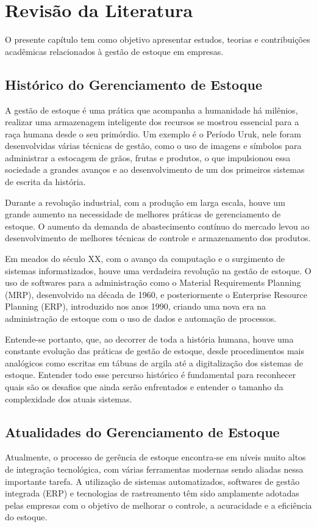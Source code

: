 \documentclass[
	12pt,				%
	openany,			%
	twoside,			%
	a4paper,			%
	english,			%
	brazil				%
	]{abntex2}
\begin{document}


\chapter{Revisão da Literatura}
O presente capítulo tem como objetivo apresentar estudos, teorias e contribuições acadêmicas relacionados à gestão de estoque em empresas.
\section{Histórico do Gerenciamento de Estoque}
A gestão de estoque é uma prática que acompanha a humanidade há milênios, realizar uma armazenagem inteligente dos recursos se mostrou essencial para a raça humana desde o seu primórdio. Um exemplo é o Período Uruk, nele foram desenvolvidas várias técnicas de gestão, como o uso de imagens e símbolos para administrar a estocagem de grãos, frutas e produtos, o que impulsionou essa sociedade a grandes avanços e ao desenvolvimento de um dos primeiros sistemas de escrita da história. \cite{Albright1996}

Durante a revolução industrial, com a produção em larga escala, houve um grande aumento na necessidade de melhores práticas de gerenciamento de estoque. O aumento da demanda de abastecimento contínuo do mercado levou ao desenvolvimento de melhores técnicas de controle e armazenamento dos produtos. \cite{DIAS2021}

Em meados do século XX, com o avanço da computação e o surgimento de sistemas informatizados, houve uma verdadeira revolução na gestão de estoque. O uso de softwares para a administração como o Material Requirements Planning (MRP), desenvolvido na década de 1960, e posteriormente o Enterprise Resource Planning (ERP), introduzido nos anos 1990, criando uma nova era na administração de estoque com o uso de dados e automação de processos.

Entende-se portanto, que, ao decorrer de toda a história humana, houve uma constante evolução das práticas de gestão de estoque, desde procedimentos mais analógicos como escritas em tábuas de argila até a digitalização dos sistemas de estoque. Entender todo esse percurso histórico é fundamental para reconhecer quais são os desafios que ainda serão enfrentados e entender o tamanho da complexidade dos atuais sistemas.

\section{Atualidades do Gerenciamento de Estoque}
Atualmente, o processo de gerência de estoque encontra-se em níveis muito altos de integração tecnológica, com várias ferramentas modernas sendo aliadas nessa importante tarefa. A utilização de sistemas automatizados, softwares de gestão integrada (ERP) e tecnologias de rastreamento têm sido amplamente adotadas pelas empresas com o objetivo de melhorar o controle, a acuracidade e a eficiência do estoque.
\end{document}

